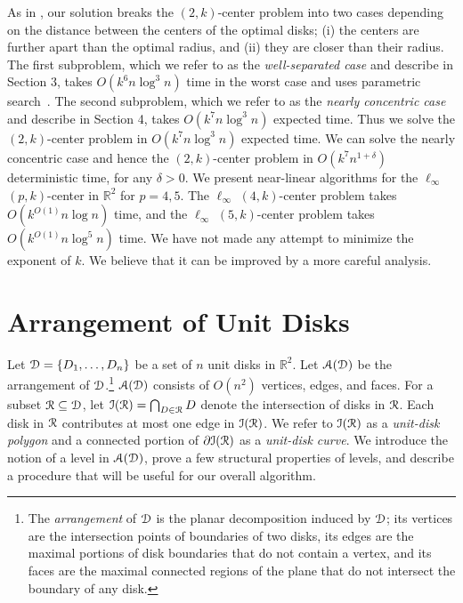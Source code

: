 \documentclass[11pt]{myclass}
\renewcommand{\b}[1]{\ensuremath{\mathbb{#1}}}
\newcommand{\EuD}{\ensuremath{\EuScript{D}}}
\newcommand{\EuA}{\ensuremath{\EuScript{A}}}
\newcommand{\EuI}{\ensuremath{\EuScript{I}}}
\newcommand{\EuR}{\ensuremath{\EuScript{R}}}
\begin{document}
As in \cite{Sha97,Epp97}, our solution breaks the $(2,k)$-center problem into two cases depending on the distance between the centers of the optimal disks; 
(i) the centers are further apart than the optimal radius, and 
(ii) they are closer than their radius.  The first subproblem, which we refer to as the \emph{well-separated case} and describe in Section 3, takes $O(k^6 n \log^3 n)$ time in the worst case and uses parametric search~\cite{Meg83}.  The second subproblem, which we refer to as the \emph{nearly concentric case} and describe in Section 4, takes $O(k^7 n \log^3 n)$ expected time.  Thus we solve the $(2,k)$-center problem in $O(k^7 n \log^3 n)$ expected time.  
We can solve the nearly concentric case and hence the $(2,k)$-center problem in $O(k^7 n^{1+\delta})$ deterministic time, for any $\delta>0$.  
We present near-linear algorithms for the $\ell_\infty$ $(p,k)$-center in $\b{R}^2$ for $p={4,5}$.  The $\ell_\infty$ $(4,k)$-center problem takes $O(k^{O(1)} n \log n)$ time, and the $\ell_\infty$ $(5,k)$-center problem takes $O(k^{O(1)} n \log^5 n)$ time.  
We have not made any attempt to minimize the exponent of $k$.  We believe that it can be improved by a more careful analysis.  




\section{Arrangement of Unit Disks}
\label{sec:arrangementD}
Let $\EuD = \{D_1, \ldots, D_n\}$ be a set of $n$ unit disks in $\b{R}^2$.  Let $\EuA(\EuD)$ be the arrangement of $\EuD$.\footnote{The \emph{arrangement} of $\EuD$ is the planar decomposition induced by $\EuD$; its vertices are the intersection points of boundaries of two disks, its edges are the maximal portions of disk boundaries that do not contain a vertex, and its faces are the maximal connected regions of the plane that do not intersect the boundary of any disk.}  $\EuA(\EuD)$ consists of $O(n^2)$ vertices, edges, and faces.  For a subset $\EuR \subseteq \EuD$, let $\EuI(\EuR) = \bigcap_{D \in \EuR} D$ denote the intersection of disks in $\EuR$.  Each disk in $\EuR$ contributes at most one edge in $\EuI(\EuR)$.  We refer to $\EuI(\EuR)$ as a \emph{unit-disk polygon} and a connected portion of $\partial \EuI(\EuR)$ as a \emph{unit-disk curve}.  
We introduce the notion of a level in $\EuA(\EuD)$, prove a few structural properties of levels, and describe a procedure that will be useful for our overall algorithm.  
\end{document}
